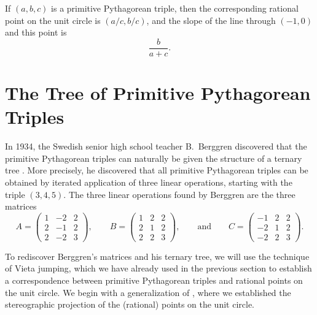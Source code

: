 \begin{remark}
  If $(a,b,c)$ is a primitive Pythagorean triple, then the corresponding rational point on the unit circle is $(a/c,b/c)$,
  and the slope of the line through $(-1,0)$ and this point is
  \begin{equation*}
    \frac{b}{a+c}.
  \end{equation*}
\end{remark}

\section{The Tree of Primitive Pythagorean Triples}\label{section:tree-of-pythagorean-triples}

In 1934, the Swedish senior high school teacher B.~Berggren discovered that the primitive Pythagorean triples can naturally be given the structure of a ternary tree \cite{berggren1934}. More precisely, he discovered that all primitive Pythagorean triples can be obtained by iterated application of three linear operations, starting with the triple $(3,4,5)$. The three linear operations found by Berggren are the three matrices
\begin{equation*}
  A =
  \left(
    \begin{matrix}
      1 & -2 & 2 \\
      2 & -1 & 2 \\
      2 & -2 & 3
    \end{matrix}
  \right),\qquad
  B =
  \left(
    \begin{matrix}
      1 & 2 & 2 \\
      2 & 1 & 2 \\
      2 & 2 & 3
    \end{matrix}
  \right),\qquad\text{and}\qquad
  C =
  \left(
    \begin{matrix}
      -1 & 2 & 2 \\
      -2 & 1 & 2 \\
      -2 & 2 & 3
    \end{matrix}
  \right).
\end{equation*}

To rediscover Berggren's matrices and his ternary tree, we will use the technique of Vieta jumping, which we have already used in the previous section to establish a correspondence between primitive Pythagorean triples and rational points on the unit circle. We begin with a generalization of , where we established the stereographic projection of the (rational) points on the unit circle.

